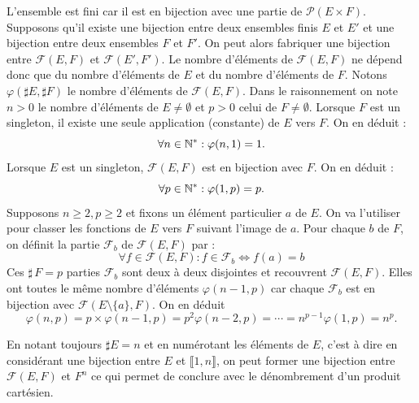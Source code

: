 \begin{demo}
 L'ensemble est fini car il est en bijection avec une partie de $\mathcal P(E\times F)$.\newline
Supposons qu'il existe une bijection entre deux ensembles finis $E$ et $E'$ et une bijection entre deux ensembles $F$ et $F'$. On peut alors fabriquer une bijection entre $\mathcal{F}(E,F)$ et $\mathcal{F}(E',F')$. Le nombre d'éléments de $\mathcal{F}(E,F)$ ne dépend donc que du nombre d'éléments de $E$ et du nombre d'éléments de $F$.\newline
Notons $\varphi(\sharp E, \sharp F)$ le nombre d'éléments de $\mathcal{F}(E,F)$. Dans le raisonnement on note $n > 0$ le nombre d'éléments de $E\neq\emptyset$ et $p > 0$ celui de $F\neq\emptyset$.\newline
Lorsque $F$ est un singleton, il existe une seule application (constante) de $E$ vers $F$. On en déduit :
\begin{displaymath}
 \forall n\in\mathbb{N}^* : \varphi(n,1) = 1.
\end{displaymath}
Lorsque $E$ est un singleton, $\mathcal{F}(E,F)$ est en bijection avec $F$. On en déduit :  
\begin{displaymath}
 \forall p\in\mathbb{N}^* : \varphi(1,p) = p.
\end{displaymath}
Supposons $n\geq 2 , p\geq2$ et fixons un élément particulier $a$ de $E$. On va l'utiliser pour classer les fonctions de $E$ vers $F$ suivant l'image de $a$.\newline
Pour chaque $b$ de $F$, on définit la partie $\mathcal{F}_b$ de $\mathcal{F}(E,F)$ par :
\begin{displaymath}
 \forall f\in \mathcal{F}(E,F) : f\in \mathcal{F}_b \Leftrightarrow f(a) = b
\end{displaymath}
Ces $\sharp\, F = p$ parties $\mathcal{F}_b$ sont deux à deux disjointes et recouvrent $\mathcal{F}(E,F)$.\newline
Elles ont toutes le même nombre d'éléments $\varphi(n-1,p)$ car chaque $\mathcal{F}_b$ est en bijection avec $\mathcal{F}(E\setminus\{a\},F)$.\newline
On en déduit
\begin{displaymath}
 \varphi(n,p) = p \times\varphi(n-1,p) = p^2\varphi(n-2,p) = \cdots = n^{p-1}\varphi(1,p) = n^p.
\end{displaymath}
\end{demo}
\begin{rem}
  En notant toujours $\sharp E = n$ et en numérotant les éléments de $E$, c'est à dire en considérant une bijection entre $E$ et $\llbracket 1,n \rrbracket$, on peut former une bijection entre $\mathcal{F}(E,F)$ et $F^n$ ce qui permet de conclure avec le dénombrement d'un produit cartésien.
\end{rem}
